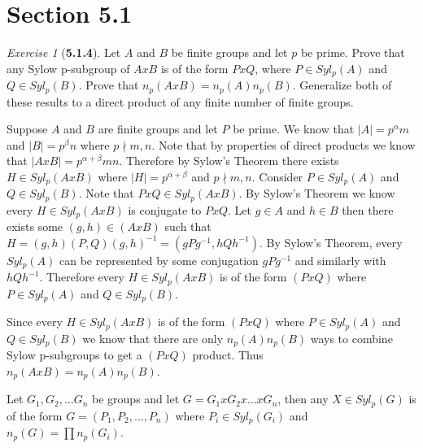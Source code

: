 \documentclass[12pt]{amsart}
\makeatletter
\theoremstyle{remark}
\newtheorem*{exercise}{Exercise}%
\renewenvironment{proof}[1][\proofname]{\par\doublespacing
  \pushQED{\qed}%
  \normalfont \topsep6\p@\@plus6\p@\relax
  \list{}{%
    \settowidth{\leftmargin}{\itshape\proofname:\hskip\labelsep}%
    \setlength{\labelwidth}{0pt}%
    \setlength{\itemindent}{-\leftmargin}%
  }%
  \item[\hskip\labelsep\itshape#1\@addpunct{:}]\ignorespaces
}{%
  \popQED\endlist\@endpefalse
  \singlespacing
}
\theoremstyle{mycomment}
\makeatother
\begin{document}
\thispagestyle{fancy}
\author{Coordinator: Coordinator's Name}








\section*{\textbf{Section 5.1}}

\begin{exercise}[\textbf{5.1.4}] Let $A$ and $B$ be finite groups and let $p$ be prime. Prove that any Sylow p-subgroup of $AxB$
  is of the form $PxQ$, where $P \in Syl_p(A)$ and $Q \in Syl_p(B)$. Prove that $n_p(AxB) = n_p(A)n_p(B)$. Generalize both of these results 
  to a direct product of any finite number of finite groups.
  \begin{proof} Suppose $A$ and $B$ are finite groups and let $P$ be prime. We know that $|A| = p^{\alpha}m$ and $|B| = p^{\beta}n$ where $p \nmid m, n$.
    Note that by properties of direct products we know that $|A x B| = p^{\alpha + \beta}mn$. Therefore by Sylow's Theorem there exists $H \in Syl_p(AxB)$ where 
    $|H| = p^{\alpha + \beta}$ and $p \nmid m, n$. Consider $P \in Syl_p(A)$ and $Q \in Syl_p(B)$. Note that $P x Q \in Syl_p(AxB)$. By Sylow's Theorem we know every 
    $H \in Syl_p(AxB)$ is conjugate to $PxQ$. Let $g \in A$ and $h \in B$ then there exists some $(g, h) \in (AxB)$ such that $H = (g, h)(P, Q)(g, h)^{-1} = (gPg^{-1}, hQh^{-1})$. 
    By Sylow's Theorem, every $Syl_p(A)$ can be represented by some conjugation $gPg^{-1}$ and similarly with $hQh^{-1}$. Therefore every $H \in Syl_p(AxB)$ is of the form $(PxQ)$ where 
    $P \in Syl_p(A)$ and $Q \in Syl_p(B)$.


    Since every $H \in Syl_p(AxB)$ is of the form $(PxQ)$ where $P \in Syl_p(A)$ and $Q \in Syl_p(B)$ we know that there are only 
    $n_p(A)n_p(B)$ ways to combine Sylow p-subgroups to get a $(PxQ)$ product. Thus $n_p(AxB) = n_p(A)n_p(B)$.

    Let $G_1, G_2, \dots G_n$ be groups and let $G = G_1 x G_2 x \dots x G_n$, then any $X \in Syl_p(G)$ is of the form 
    $G = (P_1, P_2, \dots ,P_n)$ where $P_i \in Syl_p(G_i)$ and $n_p(G) = \prod n_p(G_i)$. 

  \end{proof}
\end{exercise}
\vspace{.15in}
\end{document}
